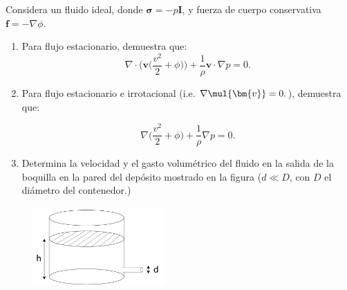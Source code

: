 \documentclass[../main.tex]{subfiles}
\begin{document}
\begin{problema}
	Considera un fluido ideal, donde \(\bm{\sigma} = -p \bm{I}\),
	y fuerza de cuerpo conservativa \(\bm{f} = - \nabla{\phi}\).

	\begin{enumerate}
		\item Para flujo estacionario, demuestra que:
		      \begin{equation*}
			      \nabla \cdot{\Biggl(\bm{v}\Biggl(\dfrac{v^{2}}{2} + \phi\Biggr)\Biggr)}
			      + \dfrac{1}{\rho}\bm{v} \cdot \nabla{p} = 0.
		      \end{equation*}
		\item Para flujo estacionario e irrotacional (i.e. \(\nabla \mul{\bm{v}} = 0.\)),
		      demuestra que:

		      \begin{equation*}
			      \nabla{\Biggl(\dfrac{v^{2}}{2} + \phi\Biggr)} + \dfrac{1}{\rho}\nabla{p} = 0.
		      \end{equation*}
		\item Determina la velocidad y el gasto volumétrico del fluido en la salida
		      de la boquilla en la pared del depósito mostrado en la figura
		      (\(d \ll D\), con \(D\) el diámetro del contenedor.)
	\end{enumerate}

	\begin{figure}[htb]
		\centering
		\includegraphics[width=0.45\textwidth]{figs/problema02.png}
	\end{figure}
\end{problema}
\end{document}
